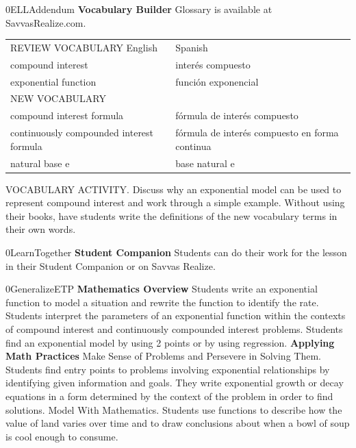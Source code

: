 \documentclass{article}
\newenvironment{te-addendum}[2]{}{}     %
\newcommand{\placeholder}[2]{}          %
\begin{document}
\begin{te-addendum}{0}{ELLAddendum}
\textbf{Vocabulary Builder}
Glossary is available at SavvasRealize.com.
\begin{tabular}{ll}
REVIEW VOCABULARY English & Spanish \\
compound interest & interés compuesto \\
exponential function & función exponencial \\
NEW VOCABULARY & \\
compound interest formula & fórmula de interés compuesto \\
continuously compounded interest formula & fórmula de interés compuesto en forma continua \\
natural base e & base natural e \\
\end{tabular}
VOCABULARY ACTIVITY. Discuss why an exponential model can be used to represent compound interest and work through a simple example. Without using their books, have students write the definitions of the new vocabulary terms in their own words.
\end{te-addendum}
\begin{te-addendum}{0}{LearnTogether}
\textbf{Student Companion}
Students can do their work for the lesson in their Student Companion or on Savvas Realize.
\placeholder{illustration}{Student Companion cover: luminous purple and blue circular design on black; Student Companion, enVision Algebra 2, SAVVAS.}
\end{te-addendum}
\begin{te-addendum}{0}{GeneralizeETP}
\textbf{Mathematics Overview}
Students write an exponential function to model a situation and rewrite the function to identify the rate.
Students interpret the parameters of an exponential function within the contexts of compound interest and continuously compounded interest problems.
Students find an exponential model by using 2 points or by using regression.
\textbf{Applying Math Practices}
Make Sense of Problems and Persevere in Solving Them. Students find entry points to problems involving exponential relationships by identifying given information and goals. They write exponential growth or decay equations in a form determined by the context of the problem in order to find solutions.
Model With Mathematics. Students use functions to describe how the value of land varies over time and to draw conclusions about when a bowl of soup is cool enough to consume.
\end{te-addendum}
\end{document}
